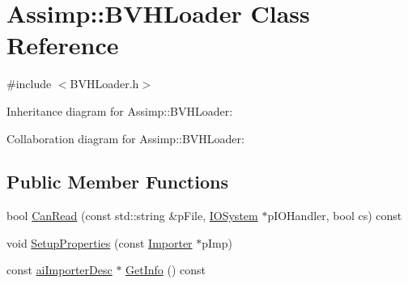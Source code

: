 \hypertarget{class_assimp_1_1_b_v_h_loader}{\section{Assimp\+:\+:B\+V\+H\+Loader Class Reference}
\label{class_assimp_1_1_b_v_h_loader}
}


{\ttfamily \#include $<$B\+V\+H\+Loader.\+h$>$}



Inheritance diagram for Assimp\+:\+:B\+V\+H\+Loader\+:


Collaboration diagram for Assimp\+:\+:B\+V\+H\+Loader\+:
\subsection*{Public Member Functions}
\begin{DoxyCompactItemize}
\item 
bool \hyperlink{class_assimp_1_1_b_v_h_loader_aa5b4ccf7a0a79f74f72cb2eaacdf8eba}{Can\+Read} (const std\+::string \&p\+File, \hyperlink{class_assimp_1_1_i_o_system}{I\+O\+System} $\ast$p\+I\+O\+Handler, bool cs) const 
\item 
void \hyperlink{class_assimp_1_1_b_v_h_loader_a8efcc5b879f1d5595feb1c3d505fa536}{Setup\+Properties} (const \hyperlink{class_assimp_1_1_importer}{Importer} $\ast$p\+Imp)
\item 
const \hyperlink{structai_importer_desc}{ai\+Importer\+Desc} $\ast$ \hyperlink{class_assimp_1_1_b_v_h_loader_a289d1569988ab2b4c5b1def002777f9d}{Get\+Info} () const 
\end{DoxyCompactItemize}
